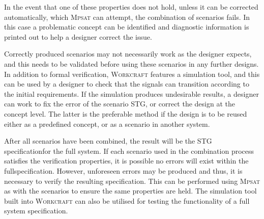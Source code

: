 \documentclass[british, journal]{IEEEtran}
\newcommand{\noun}[1]{\textsc{#1}}
\begin{document}
In the event that one of these properties does not hold, unless it can be
corrected
automatically, which \noun{Mpsat} can attempt, the combination of scenarios
fails.
In this case a problematic concept can be identified and diagnostic information
is printed out to help a designer correct the issue.

Correctly produced scenarios may not necessarily work as the designer expects,
and this needs to be validated before using these scenarios
in any further designs. In addition to formal verification, \noun{Workcraft}
features a simulation tool,
and this can be used by a designer to check that the signals can transition
according to the initial requirements. If the simulation produces
undesirable results, a designer can work to fix the error of the scenario
STG, or correct the design at the concept level. The latter is the
preferable method if the design is to be reused either as a predefined
concept, or as a scenario in another system.

After all scenarios have been combined, the result will be the STG specificationfor the full system. If each scenario used in the combination process satisfies
the verification properties, it is possible no errors will exist within the fullspecification. However,  unforeseen errors may be produced
and thus, it is necessary to verify the resulting specification. This can
be performed using \noun{Mpsat} as with the scenarios to ensure the same
properties are held. The simulation tool built into \noun{Workcraft} can also
be utilised for testing the functionality of a full system specification.

%
%
\end{document}
